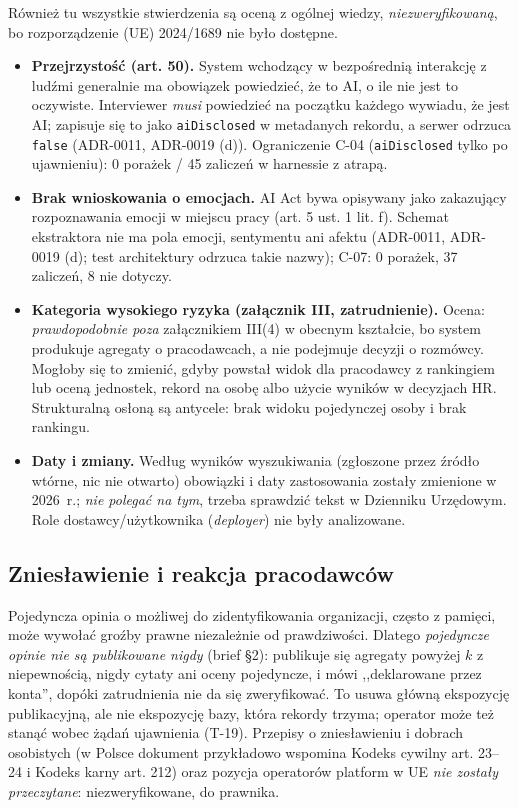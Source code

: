 Również tu wszystkie stwierdzenia są oceną z ogólnej wiedzy, \emph{niezweryfikowaną},
bo rozporządzenie (UE) 2024/1689 nie było dostępne.

\begin{itemize}[leftmargin=*]
    \item \textbf{Przejrzystość (art. 50).} System wchodzący w bezpośrednią interakcję z
    ludźmi generalnie ma obowiązek powiedzieć, że to AI, o ile nie jest to oczywiste.
    Interviewer \emph{musi} powiedzieć na początku każdego wywiadu, że jest AI;
    zapisuje się to jako \texttt{aiDisclosed} w metadanych rekordu, a serwer odrzuca
    \texttt{false} (ADR-0011, ADR-0019 (d)). Ograniczenie C-04 (\texttt{aiDisclosed} tylko
    po ujawnieniu): 0 porażek / 45 zaliczeń w harnessie z atrapą.
    \item \textbf{Brak wnioskowania o emocjach.} AI Act bywa opisywany jako
    zakazujący rozpoznawania emocji w miejscu pracy (art. 5 ust. 1 lit. f). Schemat
    ekstraktora nie ma pola emocji, sentymentu ani afektu (ADR-0011, ADR-0019 (d);
    test architektury odrzuca takie nazwy); C-07: 0 porażek, 37 zaliczeń, 8 nie dotyczy.
    \item \textbf{Kategoria wysokiego ryzyka (załącznik III, zatrudnienie).} Ocena:
    \emph{prawdopodobnie poza} załącznikiem III(4) w obecnym kształcie, bo system
    produkuje agregaty o pracodawcach, a nie podejmuje decyzji o rozmówcy. Mogłoby się
    to zmienić, gdyby powstał widok dla pracodawcy z rankingiem lub oceną jednostek,
    rekord na osobę albo użycie wyników w decyzjach HR. Strukturalną osłoną są
    antycele: brak widoku pojedynczej osoby i brak rankingu.
    \item \textbf{Daty i zmiany.} Według wyników wyszukiwania (zgłoszone przez źródło
    wtórne, nic nie otwarto) obowiązki i daty zastosowania zostały zmienione w
    2026~r.; \emph{nie polegać na tym}, trzeba sprawdzić tekst w Dzienniku Urzędowym.
    Role dostawcy/użytkownika (\emph{deployer}) nie były analizowane.
\end{itemize}

\subsection{Zniesławienie i reakcja pracodawców}

Pojedyncza opinia o możliwej do zidentyfikowania organizacji, często z pamięci, może
wywołać groźby prawne niezależnie od prawdziwości. Dlatego \emph{pojedyncze opinie nie
są publikowane nigdy} (brief §2): publikuje się agregaty powyżej $k$ z niepewnością,
nigdy cytaty ani oceny pojedyncze, i mówi ,,deklarowane przez konta'', dopóki
zatrudnienia nie da się zweryfikować. To usuwa główną ekspozycję publikacyjną, ale
nie ekspozycję bazy, która rekordy trzyma; operator może też stanąć wobec żądań
ujawnienia (T-19). Przepisy o zniesławieniu i dobrach osobistych (w Polsce dokument
przykładowo wspomina Kodeks cywilny art. 23--24 i Kodeks karny art. 212) oraz pozycja
operatorów platform w UE \emph{nie zostały przeczytane}: niezweryfikowane, do prawnika.


